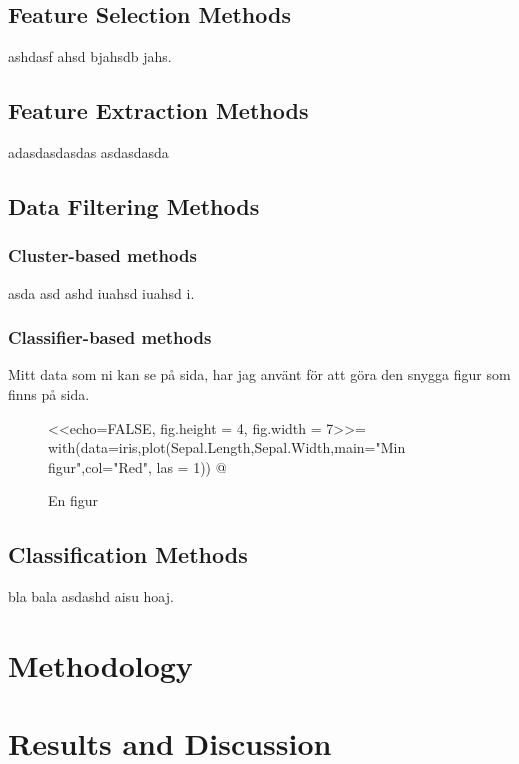 \documentclass[12pt, english, openany]{book}
\begin{document}
\section{Feature Selection Methods}
ashdasf ahsd bjahsdb jahs.



\section{Feature Extraction Methods}
adasdasdasdas asdasdasda

\section{Data Filtering Methods}
\subsection*{Cluster-based methods}
asda asd ashd iuahsd iuahsd i.

\subsection*{Classifier-based methods}
Mitt data som ni kan se på sida, har jag använt för att göra den snygga figur
som finns på sida.


\begin{figure}[H]
    \centering
    <<echo=FALSE, fig.height = 4, fig.width = 7>>=
    with(data=iris,plot(Sepal.Length,Sepal.Width,main="Min figur",col="Red", las = 1))
    @
    \caption{En figur}
    \label{fig:En-figur}
\end{figure}

\section{Classification Methods}
bla bala asdashd aisu hoaj.

\chapter{Methodology}

\chapter{Results and Discussion}





\end{document}
